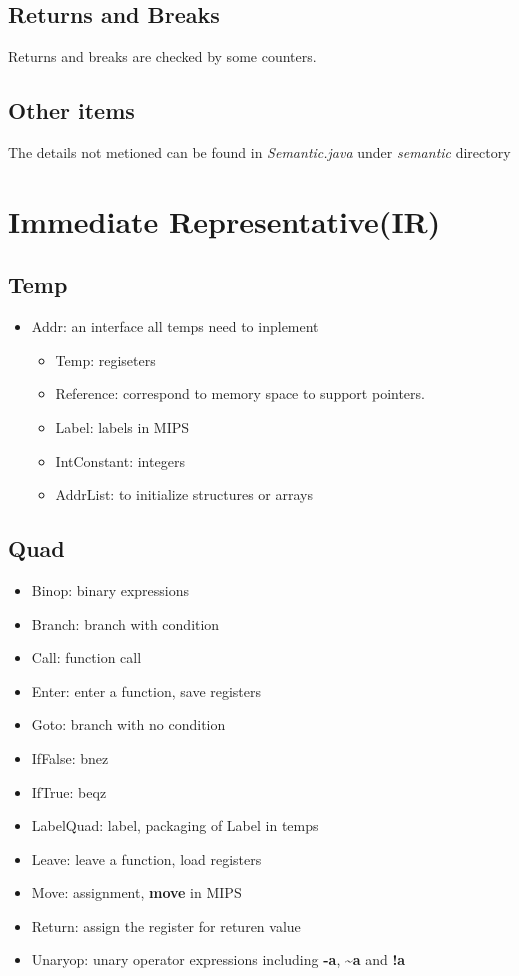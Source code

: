 \documentclass[nocopyrightspace]{sigplanconf}
\begin{document}
\subsection{Returns and Breaks}
	Returns and breaks are checked by some counters.

\subsection{Other items}
	The details not metioned can be found in \textit{Semantic.java} under \textit{semantic} directory

\section{Immediate Representative(IR)}
\subsection{Temp}
\begin{itemize}
\item Addr: an interface all temps need to inplement
\begin{itemize}
	\item Temp: regiseters
	\item Reference: correspond to memory space to support pointers.
	\item Label: labels in MIPS
	\item IntConstant: integers
	\item AddrList: to initialize structures or arrays
\end{itemize}
\end{itemize}
\subsection{Quad}
\begin{itemize}
\item Binop: binary expressions
\item Branch: branch with condition
\item Call: function call
\item Enter: enter a function, save registers
\item Goto: branch with no condition
\item IfFalse: bnez
\item IfTrue: beqz
\item LabelQuad: label, packaging of Label in temps
\item Leave: leave a function, load registers
\item Move: assignment, \textbf{move} in MIPS
\item Return: assign the register for returen value
\item Unaryop: unary operator expressions including \textbf{-a}, \textbf{\textasciitilde a} and \textbf{!a}
\end{itemize}
\end{document}
